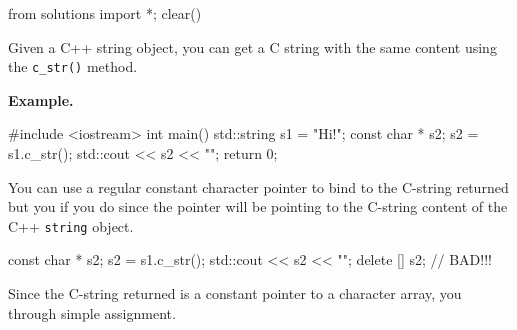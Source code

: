 \begin{python0}
from solutions import *; clear()
\end{python0}

Given a C++ string object, you can get a C string with the same content
using the \verb!c_str()! method.

\textbf{Example.}

\begin{console}
#include <iostream>
int main()
{   
    std::string s1 = "Hi!";
    const char * s2;
    s2 = s1.c_str();
    std::cout << s2 << "\n";
    return 0;
}
\end{console}

You can use a regular constant character pointer to bind to the C-string returned but you  if you do since the pointer will be pointing to the C-string content of the C++ \texttt{string} object.

\begin{console}
const char * s2;
s2 = s1.c_str();
std::cout << s2 << "\n";
delete [] s2; // BAD!!!
\end{console}

Since the C-string returned is a constant pointer to a character array,
you  through simple
assignment.


